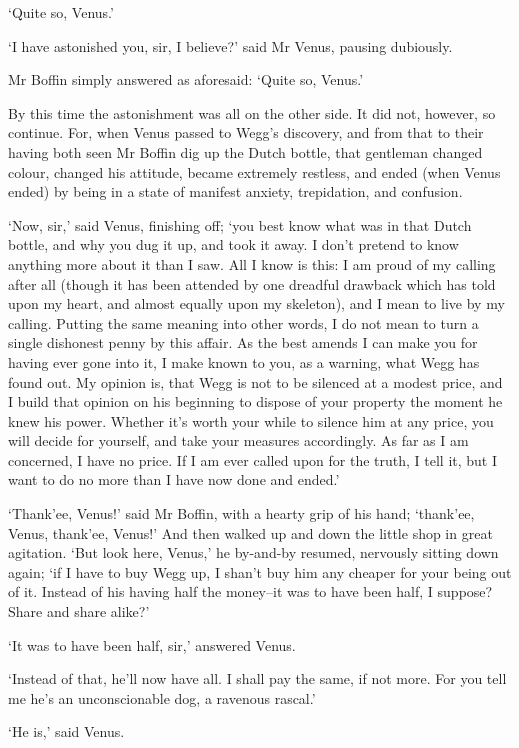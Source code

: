 ‘Quite so, Venus.’

‘I have astonished you, sir, I believe?’ said Mr Venus, pausing
dubiously.

Mr Boffin simply answered as aforesaid: ‘Quite so, Venus.’

By this time the astonishment was all on the other side. It did not,
however, so continue. For, when Venus passed to Wegg’s discovery, and
from that to their having both seen Mr Boffin dig up the Dutch bottle,
that gentleman changed colour, changed his attitude, became extremely
restless, and ended (when Venus ended) by being in a state of manifest
anxiety, trepidation, and confusion.

‘Now, sir,’ said Venus, finishing off; ‘you best know what was in that
Dutch bottle, and why you dug it up, and took it away. I don’t pretend
to know anything more about it than I saw. All I know is this: I am
proud of my calling after all (though it has been attended by one
dreadful drawback which has told upon my heart, and almost equally upon
my skeleton), and I mean to live by my calling. Putting the same meaning
into other words, I do not mean to turn a single dishonest penny by this
affair. As the best amends I can make you for having ever gone into it,
I make known to you, as a warning, what Wegg has found out. My opinion
is, that Wegg is not to be silenced at a modest price, and I build that
opinion on his beginning to dispose of your property the moment he knew
his power. Whether it’s worth your while to silence him at any price,
you will decide for yourself, and take your measures accordingly. As
far as I am concerned, I have no price. If I am ever called upon for
the truth, I tell it, but I want to do no more than I have now done and
ended.’

‘Thank’ee, Venus!’ said Mr Boffin, with a hearty grip of his hand;
‘thank’ee, Venus, thank’ee, Venus!’ And then walked up and down the
little shop in great agitation. ‘But look here, Venus,’ he by-and-by
resumed, nervously sitting down again; ‘if I have to buy Wegg up, I
shan’t buy him any cheaper for your being out of it. Instead of his
having half the money--it was to have been half, I suppose? Share and
share alike?’

‘It was to have been half, sir,’ answered Venus.

‘Instead of that, he’ll now have all. I shall pay the same, if not more.
For you tell me he’s an unconscionable dog, a ravenous rascal.’

‘He is,’ said Venus.


